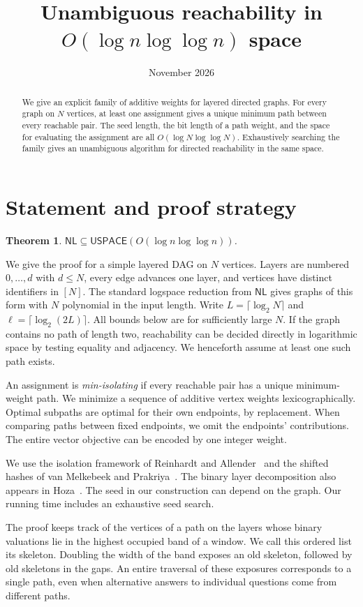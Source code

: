 \documentclass[11pt]{article}
\title{Unambiguous reachability in \(O(\log n\log\log n)\) space}
\author{}
\date{November 2026}
\newtheorem{theorem}{Theorem}
\newcommand{\NL}{\mathsf{NL}}
\newcommand{\US}{\mathsf{USPACE}}
\begin{document}
\maketitle
\begin{abstract}
We give an explicit family of additive weights for layered directed graphs.
For every graph on $N$ vertices, at least one assignment gives a unique
minimum path between every reachable pair. The seed length, the bit
length of a path weight, and the space for evaluating the assignment are
all $O(\log N\log\log N)$. Exhaustively searching the family gives an
unambiguous algorithm for directed reachability in the same space.
\end{abstract}

\section{Statement and proof strategy}

\begin{theorem}\label{thm:main}
$\NL\subseteq\US(O(\log n\log\log n))$.
\end{theorem}
We give the proof for a simple layered DAG on $N$ vertices. Layers are numbered
$0,\ldots,d$ with $d\le N$, every edge advances one layer, and vertices have
distinct identifiers in $[N]$. The standard logspace reduction from $\NL$
gives graphs of this form with $N$ polynomial in the input length. Write
$L=\lceil\log_2 N\rceil$ and $\ell=\lceil\log_2(2L)\rceil$. All bounds below
are for sufficiently large $N$. If the graph contains no path of length two,
reachability can be decided directly in logarithmic space by testing equality
and adjacency. We henceforth assume at least one such path exists.

An assignment is \emph{min-isolating} if every reachable pair has a unique
minimum-weight path. We minimize a sequence of additive vertex weights
lexicographically. Optimal subpaths are optimal for their own endpoints,
by replacement. When comparing paths between fixed endpoints, we omit the
endpoints' contributions. The entire vector objective can be encoded by
one integer weight.


We use the isolation framework of Reinhardt and Allender~\cite{RA} and
the shifted hashes of van Melkebeek and Prakriya~\cite{vMP}. The binary
layer decomposition also appears in Hoza~\cite[Appendix A]{Hoza}.
The seed in our construction can depend on the graph. Our running time
includes an exhaustive seed search.

The proof keeps track of the vertices of a path on the layers whose
binary valuations lie in the highest occupied band of a window.
We call this ordered list its skeleton. Doubling the width of the band
exposes an old skeleton, followed by old skeletons in the gaps. An
entire traversal of these exposures corresponds to a single path, even
when alternative answers to individual questions come from different paths.
\end{document}

